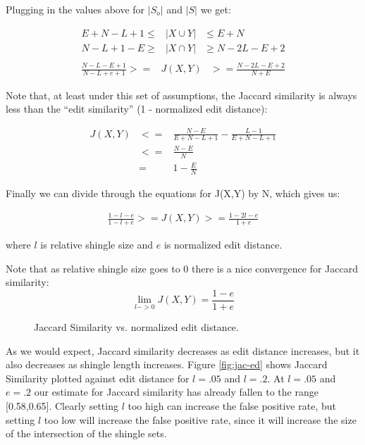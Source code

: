 \documentclass{acm_proc_article-sp}
\begin{document}
Plugging in the values above for $|S_o|$ and $|S|$ we get:

\begin{eqnarray*}
E + N - L + 1  \le & |X \cup Y| & \le E + N \\
N - L + 1 - E  \ge & |X \cap Y| & \ge N - 2L - E + 2 \\
\end{eqnarray*}
\begin{eqnarray*}
\frac{N - L - E + 1 }{N - L + e + 1} >= & J(X,Y) & >= \frac{N - 2L - E + 2}{N + E}
\end{eqnarray*}

Note that, at least under this set of assumptions, the Jaccard similarity is always less than the ``edit similarity'' (1 - normalized edit distance):

\begin{eqnarray*}
J(X,Y) & <= & \frac{N - E}{E + N - L + 1} - \frac{L - 1}{E + N - L + 1} \\
       & <= & \frac{N - E}{N} \\ 
       & =  & 1 - \frac{E}{N}
\end{eqnarray*}

Finally we can divide through the equations for J(X,Y) by N, which gives us:

\begin{eqnarray*}
\frac{1 - l - e}{1 - l + e} >= J(X,Y) >= \frac{1 - 2l - e}{1 + e}
\end{eqnarray*}

where $l$ is relative shingle size and $e$ is normalized edit distance.

Note that as relative shingle size goes to 0 there is a nice convergence for Jaccard similarity:
\[\lim_{l->0}J(X,Y) = \frac{1 - e}{1 + e}\]

\begin{figure*}
\centering
{}
\caption{Jaccard Similarity vs. normalized edit distance.}
\label{jac-ed}
\end{figure*}

As we would expect, Jaccard similarity decreases as edit distance increases, but it also decreases as shingle length increases. Figure \ref{fig:jac-ed} shows Jaccard Similarity plotted against edit distance for $l = .05$ and $l = .2$. At $l = .05$ and $e = .2$ our estimate for Jaccard similarity has already fallen to the range [0.58,0.65]. Clearly setting $l$ too high can increase the false positive rate, but setting $l$ too low will increase the false positive rate, since it will increase the size of the intersection of the shingle sets.
\end{document}
